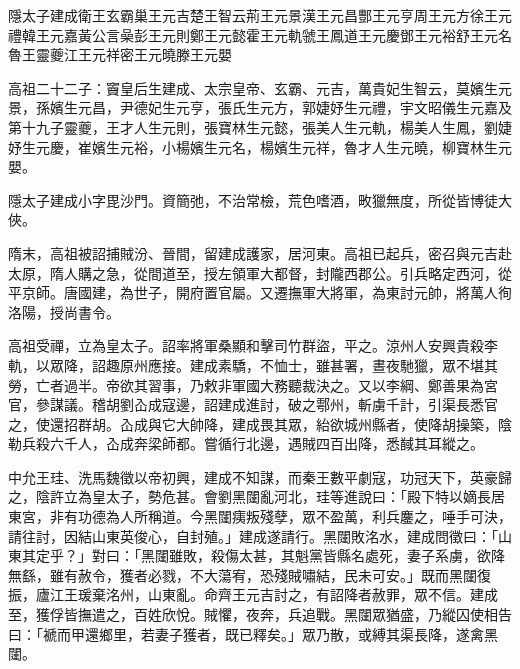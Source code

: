 
\begin{pinyinscope}

 隱太子建成衛王玄霸巢王元吉楚王智云荊王元景漢王元昌酆王元亨周王元方徐王元禮韓王元嘉黃公言喿彭王元則鄭王元懿霍王元軌虢王鳳道王元慶鄧王元裕舒王元名魯王靈夔江王元祥密王元曉滕王元嬰



 高祖二十二子：竇皇后生建成、太宗皇帝、玄霸、元吉，萬貴妃生智云，莫嬪生元景，孫嬪生元昌，尹德妃生元亨，張氏生元方，郭婕妤生元禮，宇文昭儀生元嘉及第十九子靈夔，王才人生元則，張寶林生元懿，張美人生元軌，楊美人生鳳，劉婕妤生元慶，崔嬪生元裕，小楊嬪生元名，楊嬪生元祥，魯才人生元曉，柳寶林生元嬰。



 隱太子建成小字毘沙門。資簡弛，不治常檢，荒色嗜酒，畋獵無度，所從皆博徒大俠。



 隋末，高祖被詔捕賊汾、晉間，留建成護家，居河東。高祖已起兵，密召與元吉赴太原，隋人購之急，從間道至，授左領軍大都督，封隴西郡公。引兵略定西河，從平京師。唐國建，為世子，開府置官屬。又遷撫軍大將軍，為東討元帥，將萬人徇洛陽，授尚書令。



 高祖受禪，立為皇太子。詔率將軍桑顯和擊司竹群盜，平之。涼州人安興貴殺李軌，以眾降，詔趣原州應接。建成素驕，不恤士，雖甚署，晝夜馳獵，眾不堪其勞，亡者過半。帝欲其習事，乃敕非軍國大務聽裁決之。又以李綱、鄭善果為宮官，參謀議。稽胡劉屳成寇邊，詔建成進討，破之鄠州，斬虜千計，引渠長悉官之，使還招群胡。屳成與它大帥降，建成畏其眾，紿欲城州縣者，使降胡操築，陰勒兵殺六千人，屳成奔梁師都。嘗循行北邊，遇賊四百出降，悉馘其耳縱之。



 中允王珪、洗馬魏徵以帝初興，建成不知謀，而秦王數平劇寇，功冠天下，英豪歸之，陰許立為皇太子，勢危甚。會劉黑闥亂河北，珪等進說曰：「殿下特以嫡長居東宮，非有功德為人所稱道。今黑闥痍叛殘孽，眾不盈萬，利兵鏖之，唾手可決，請往討，因結山東英俊心，自封殖。」建成遂請行。黑闥敗洺水，建成問徵曰：「山東其定乎？」對曰：「黑闥雖敗，殺傷太甚，其魁黨皆縣名處死，妻子系虜，欲降無繇，雖有赦令，獲者必戮，不大蕩宥，恐殘賊嘯結，民未可安。」既而黑闥復振，廬江王瑗棄洺州，山東亂。命齊王元吉討之，有詔降者赦罪，眾不信。建成至，獲俘皆撫遣之，百姓欣悅。賊懼，夜奔，兵追戰。黑闥眾猶盛，乃縱囚使相告曰：「褫而甲還鄉里，若妻子獲者，既已釋矣。」眾乃散，或縛其渠長降，遂禽黑闥。




\end{pinyinscope}
